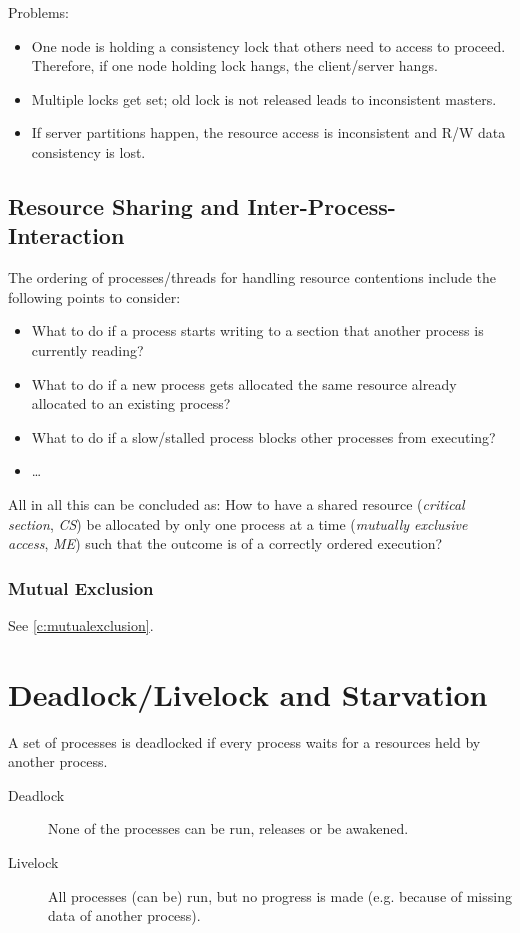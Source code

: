             Problems:
            \begin{itemize}
            	\item One node is holding a consistency lock that others need to access to proceed. Therefore, if one node holding lock hangs, the client/server hangs.
            	\item Multiple locks get set; old lock is not released leads to inconsistent masters.
            	\item If server partitions happen, the resource access is inconsistent and R/W data consistency is lost.
            \end{itemize}

        \subsection{Resource Sharing and Inter-Process-Interaction}
            The ordering of processes/threads for handling resource contentions include the following points to consider:
            \begin{itemize}
            	\item What to do if a process starts writing to a section that another process is currently reading?
            	\item What to do if a new process gets allocated the same resource already allocated to an existing process?
            	\item What to do if a slow/stalled process blocks other processes from executing?
            	\item \dots
            \end{itemize}
            All in all this can be concluded as: How to have a shared resource (\textit{critical section}, \textit{CS}) be allocated by only one process at a time (\textit{mutually exclusive access}, \textit{ME}) such that the outcome is of a correctly ordered execution?
        
            \subsubsection{Mutual Exclusion}
                See \ref{c:mutualexclusion}.

    \section{Deadlock/Livelock and Starvation}
        A set of processes is deadlocked if every process waits for a resources held by another process.
        \begin{description}
        	\item[Deadlock] None of the processes can be run, releases or be awakened.
        	\item[Livelock] All processes (can be) run, but no progress is made (e.g. because of missing data of another process).
        \end{description}

